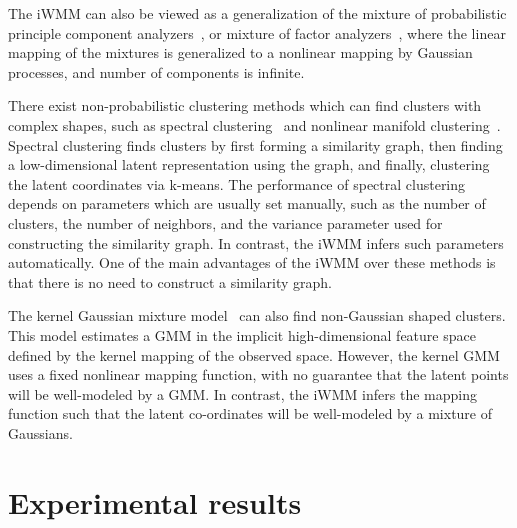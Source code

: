 The iWMM can also be viewed as a generalization of the mixture of probabilistic principle component analyzers~\cite{tipping1999mixtures}, or mixture of factor analyzers~\cite{ghahramani2000variational}, where the linear mapping of the mixtures is generalized to a nonlinear mapping by Gaussian processes, and number of components is infinite.%

There exist non-probabilistic clustering methods which can find clusters with complex shapes, such as spectral clustering~\cite{ng2002spectral} and nonlinear manifold clustering~\cite{cao2006nonlinear,elhamifar2011sparse}.
Spectral clustering finds clusters by first forming a similarity graph, then finding a low-dimensional latent representation using the graph, and finally, clustering the latent coordinates via k-means.
The performance of spectral clustering depends on parameters which are usually set manually, such as the number of clusters, the number of neighbors, and the variance parameter used for constructing the similarity graph.
In contrast, the iWMM infers such parameters automatically.  One of the main advantages of the iWMM over these methods is that there is no need to construct a similarity graph.

The kernel Gaussian mixture model~\cite{wang2003kernel} can also find non-Gaussian shaped clusters.
This model estimates a GMM in the implicit high-dimensional feature space defined by the kernel mapping of the observed space.
However, the kernel GMM uses a fixed nonlinear mapping function, with no guarantee that the latent points will be well-modeled by a GMM.  
In contrast, the iWMM infers the mapping function such that the latent co-ordinates will be well-modeled by a mixture of Gaussians.


\section{Experimental results}


